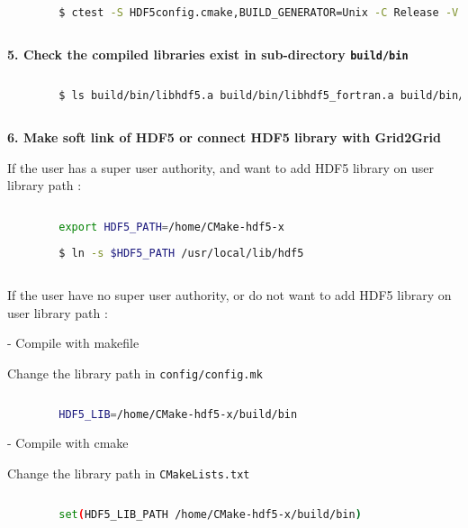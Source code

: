 		\begin{lstlisting}[language=bash]
		
		$ ctest -S HDF5config.cmake,BUILD_GENERATOR=Unix -C Release -V -O hdf5.log
		
		\end{lstlisting}

		\vspace{1em}		
		\textbf{5. Check the compiled libraries exist in sub-directory \texttt{build/bin}}
		
		\begin{lstlisting}[language=bash]
		
		$ ls build/bin/libhdf5.a build/bin/libhdf5_fortran.a build/bin/libszip.a build/bin/libz.a
		
		\end{lstlisting}
		
		\pagebreak
		\textbf{6. Make soft link of HDF5 or connect HDF5 library with Grid2Grid}
		
		If the user has a super user authority, and want to add HDF5 library on user library path :
		
		\begin{lstlisting}[language=bash]
		
		export HDF5_PATH=/home/CMake-hdf5-x
		
		$ ln -s $HDF5_PATH /usr/local/lib/hdf5
		
		\end{lstlisting}
		
		
		If the user have no super user authority, or do not want to add HDF5 library on user library path :
		
		\vspace{0.5em}
		- Compile with makefile
		
		Change the library path in \texttt{config/config.mk}
		
		\begin{lstlisting}[language=bash]
		
		HDF5_LIB=/home/CMake-hdf5-x/build/bin
		\end{lstlisting}
		
		\vspace{0.5em}
		- Compile with cmake		
		
		Change the library path in \texttt{CMakeLists.txt}		
		
		\begin{lstlisting}[language=bash]
		
		set(HDF5_LIB_PATH /home/CMake-hdf5-x/build/bin)
		\end{lstlisting}		
		
